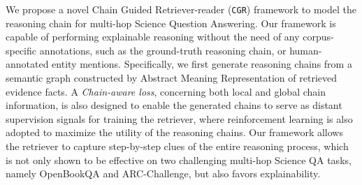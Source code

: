 We propose a novel Chain Guided Retriever-reader ({\tt CGR}) framework to model the reasoning chain for multi-hop Science Question Answering. Our framework is capable of performing explainable reasoning without the need of any corpus-specific annotations, such as the ground-truth reasoning chain, or human-annotated entity mentions. Specifically, we first generate reasoning chains from a semantic graph constructed by Abstract Meaning Representation of retrieved evidence facts. A \textit{Chain-aware loss}, concerning both local and global chain information, is also designed to enable the generated chains to serve as distant supervision signals for training the retriever, where reinforcement learning is also adopted to maximize the utility of the reasoning chains. Our framework allows the retriever to capture step-by-step clues of the entire reasoning process, which is not only shown to be effective on two challenging multi-hop Science QA tasks, namely OpenBookQA and ARC-Challenge, but also favors explainability.
